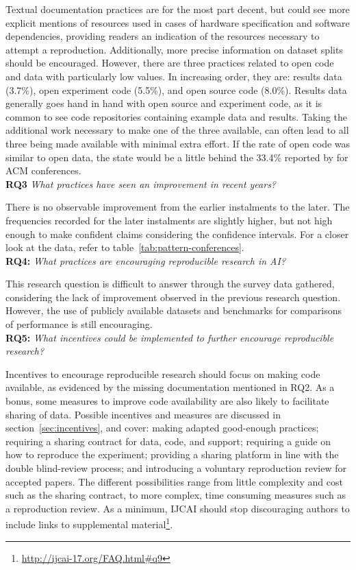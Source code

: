 Textual documentation practices are for the most part decent, but could see more explicit mentions of resources used in cases of hardware specification and software dependencies, providing readers an indication of the resources necessary to attempt a reproduction. Additionally, more precise information on dataset splits should be encouraged. However, there are three practices related to open code and data with particularly low values. In increasing order, they are: results data (3.7\%), open experiment code (5.5\%), and open source code (8.0\%). Results data generally goes hand in hand with open source and experiment code, as it is common to see code repositories containing example data and results. Taking the additional work necessary to make one of the three available, can often lead to all three being made available with minimal extra effort. If the rate of open code was similar to open data, the state would be a little behind the 33.4\% reported by \cite{Collberg2016} for ACM conferences.\\

\textbf{RQ3} \emph{What practices have seen an improvement in recent years?}

There is no observable improvement from the earlier instalments to the later. The frequencies recorded for the later instalments are slightly higher, but not high enough to make confident claims considering the confidence intervals. For a closer look at the data, refer to table~\ref{tab:pattern-conferences}.\\

\textbf{RQ4:} \emph{What practices are encouraging reproducible research in AI?}

This research question is difficult to answer through the survey data gathered, considering the lack of improvement observed in the previous research question. However, the use of publicly available datasets and benchmarks for comparisons of performance is still encouraging.\\

\textbf{RQ5:} \emph{What incentives could be implemented to further encourage reproducible research?}

Incentives to encourage reproducible research should focus on making code available, as evidenced by the missing documentation mentioned in RQ2. As a bonus, some measures to improve code availability are also likely to facilitate sharing of data. Possible incentives and measures are discussed in section~\ref{sec:incentives}, and cover: making adapted good-enough practices; requiring a sharing contract for data, code, and support; requiring a guide on how to reproduce the experiment; providing a sharing platform in line with the double blind-review process; and introducing a voluntary reproduction review for accepted papers. The different possibilities range from little complexity and cost such as the sharing contract, to more complex, time consuming measures such as a reproduction review. As a minimum, IJCAI should stop discouraging authors to include links to supplemental material\footnote{\url{http://ijcai-17.org/FAQ.html\#q9}}.\\

